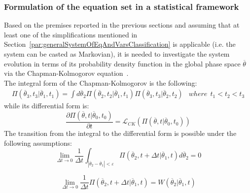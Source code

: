 \subsubsection{Formulation of the equation set in a statistical framework}
Based on the premises reported in the previous sections and assuming 
that at least one of the simplifications mentioned in 
Section~\ref{par:generalSystemOfEqAndVarsClassification} is applicable (i.e. the system can be
casted as Markovian), it is needed to investigate the system evolution 
in terms of its probability density function in the global phase space 
$\overline{\theta}$ via the Chapman-Kolmogorov 
equation~\cite{ProbReactoDynamicsDevooght}.
\\The integral form of the Chapman-Kolmogorov is the following: 
\begin{equation}
\label{eq:chapKolmogIntegralForm}
\begin{matrix}
\Pi \left (\overline{\theta}_{3},t_{3}|\overline{\theta}_{1},t_{1}  \right ) = \int 
d\overline{\theta}_{2} \Pi\left (\overline{\theta}_{2},t_{2}|
\overline{\theta}_{1},t_{1}  \right )   \Pi\left (\overline{\theta}_{3},t_{3}|
\overline{\theta}_{2},t_{2}  \right )   & 
where \: \:   t_{1} < t_{2} < t_{3}
\end{matrix}
\end{equation}
while its differential form is:
\begin{equation}
\label{eq:chapKolmogDiffForm}
\frac{\partial \Pi \left (\overline{\theta},t|\overline{\theta}_{0},t_{0}  \right )  }{\partial t} =
\mathcal{L}_{CK}\left (   \Pi \left (\overline{\theta},t|\overline{\theta}_{0},t_{0}  \right ) \right )
\end{equation}
The transition from the integral to the differential form is possible under the following assumptions: 
\begin{equation}
\label{eq:chapKolmogAssump1}
\lim_{\Delta t \to 0} \frac{1}{\Delta t}  \int_{|
\overline{\theta}_{2}-\overline{\theta}_{1}|<\varepsilon }   \Pi \left 
(\overline{\theta}_{2},t+\Delta t|\overline{\theta}_{1},t  \right ) 
d\overline{\theta}_{2} = 0
\end{equation}

\begin{equation}
\label{eq:chapKolmogAssump2}
\lim_{\Delta t \to 0} \frac{1}{\Delta t} \Pi \left (\overline{\theta}_{2},t+\Delta t|
\overline{\theta}_{1},t  \right ) = W\left ( \overline{\theta}_{2}|
\overline{\theta}_{1},t \right )
\end{equation}

